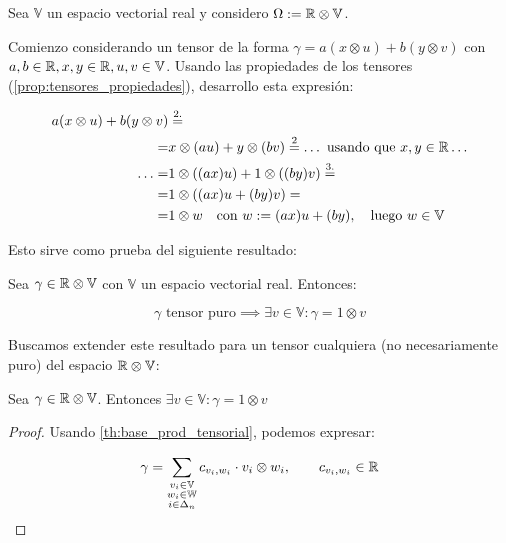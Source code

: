 \begin{ejemplo}
    Sea $\mathbb{V}$ un espacio vectorial real y considero $\Omega := \mathbb{R} \otimes \mathbb{V}$.

    Comienzo considerando un tensor de la forma $\gamma = a(x \otimes u) + b(y \otimes v)$ con $a, b \in \mathbb{R}, x, y \in \mathbb{R}, u, v \in \mathbb{V}$. Usando las propiedades de los tensores (\ref{prop:tensores_propiedades}), desarrollo esta expresión:

    \begin{equation}
    \begin{split}
        a(x \otimes u) + b(y \otimes v) &\stackrel{\text{2.}}{=} \\
        = & x \otimes (au) + y \otimes (bv) \stackrel{\text{2}}{=} \ldots \text{ usando que }  x,y \in \mathbb{R} \ldots \\
        \ldots = & 1 \otimes ((ax) u) + 1 \otimes ((by) v) \stackrel{\text{3.}}{=} \\
        = & 1 \otimes ((ax)u + (by) v) = \\
        = & 1 \otimes w \quad \text{con } w := (ax)u + (by), \quad \text{luego }w \in \mathbb{V}
    \end{split}
    \end{equation}

    Esto sirve como prueba del siguiente resultado:

    \begin{proposicion}
        Sea $\gamma \in \mathbb{R} \otimes \mathbb{V}$ con $\mathbb{V}$ un espacio vectorial real. Entonces:

        \begin{equation}
            \gamma \text{ tensor puro} \implies \exists v \in \mathbb{V}: \gamma = 1 \otimes v
        \end{equation}
    \end{proposicion}

    Buscamos extender este resultado para un tensor cualquiera (no necesariamente puro) del espacio $\mathbb{R} \otimes \mathbb{V}$:

    \begin{proposicion}
        Sea $\gamma \in \mathbb{R} \otimes \mathbb{V}$. Entonces $\exists v \in \mathbb{V}: \gamma = 1 \otimes v$
    \end{proposicion}
    \begin{proof}
        Usando \ref{th:base_prod_tensorial}, podemos expresar:

        \begin{equation}
            \gamma = \sum_{\substack{v_i \in \mathbb{V}\\ w_i \in \mathbb{W}\\ i \in \Delta_{n}}} c_{v_i, w_i} \cdot v_i \otimes w_i, \qquad c_{v_i, w_i} \in \mathbb{R}
        \end{equation}


\end{proof}
\end{ejemplo}
